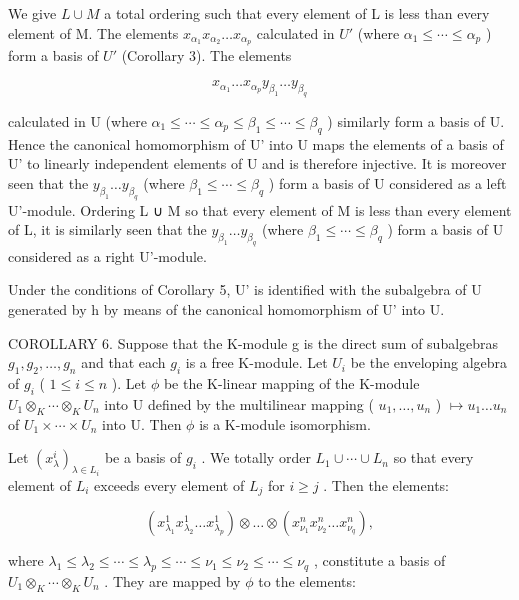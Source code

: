 We give \(L \cup M\) a total ordering such that every element of L is less than every element of M. The elements \(x_{\alpha_{1}}x_{\alpha_{2}}\ldots x_{\alpha_{p}}\) calculated in \(U'\) (where \(\alpha_{1} \leqslant \cdots \leqslant \alpha_{p}\) ) form a basis of \(U'\) (Corollary 3). The elements

\[
x _ {\alpha_ {1}} \dots x _ {\alpha_ {p}} y _ {\beta_ {1}} \dots y _ {\beta_ {q}}
\]

calculated in U (where \(\alpha_{1} \leqslant \cdots \leqslant \alpha_{p} \leqslant \beta_{1} \leqslant \cdots \leqslant \beta_{q}\) ) similarly form a basis of U. Hence the canonical homomorphism of U' into U maps the elements of a basis of U' to linearly independent elements of U and is therefore injective. It is moreover seen that the \(y_{\beta_1} \ldots y_{\beta_q}\) (where \(\beta_{1} \leqslant \cdots \leqslant \beta_{q}\) ) form a basis of U considered as a left U'-module. Ordering L ∪ M so that every element of M is less than every element of L, it is similarly seen that the \(y_{\beta_1} \ldots y_{\beta_q}\) (where \(\beta_{1} \leqslant \cdots \leqslant \beta_{q}\) ) form a basis of U considered as a right U'-module.

Under the conditions of Corollary 5, U' is identified with the subalgebra of U generated by h by means of the canonical homomorphism of U' into U.

COROLLARY 6. Suppose that the K-module g is the direct sum of subalgebras \(g_{1}, g_{2}, \ldots, g_{n}\) and that each \(g_{i}\) is a free K-module. Let \(U_{i}\) be the enveloping algebra of \(g_{i}\) ( \(1 \leqslant i \leqslant n\) ). Let \(\phi\) be the K-linear mapping of the K-module \(U_{1} \otimes_{K} \cdots \otimes_{K} U_{n}\) into U defined by the multilinear mapping ( \(u_{1}, \ldots, u_{n}\) ) \(\mapsto u_{1} \ldots u_{n}\) of \(U_{1} \times \cdots \times U_{n}\) into U. Then \(\phi\) is a K-module isomorphism.

Let \((x_{\lambda}^{i})_{\lambda \in L_{i}}\) be a basis of \(g_{i}\) . We totally order \(L_{1} \cup \cdots \cup L_{n}\) so that every element of \(L_{i}\) exceeds every element of \(L_{j}\) for \(i \geqslant j\) . Then the elements:

\[
\left(x _ {\lambda_ {1}} ^ {1} x _ {\lambda_ {2}} ^ {1} \dots x _ {\lambda_ {p}} ^ {1}\right) \otimes \dots \otimes \left(x _ {\nu _ {1}} ^ {n} x _ {\nu _ {2}} ^ {n} \dots x _ {\nu _ {q}} ^ {n}\right),
\]

where \(\lambda_{1}\leqslant\lambda_{2}\leqslant\cdots\leqslant\lambda_{p}\leqslant\cdots\leqslant\nu_{1}\leqslant\nu_{2}\leqslant\cdots\leqslant\nu_{q}\) , constitute a basis of \(U_{1}\otimes_{K}\cdots\otimes_{K}U_{n}\) . They are mapped by \(\phi\) to the elements:

